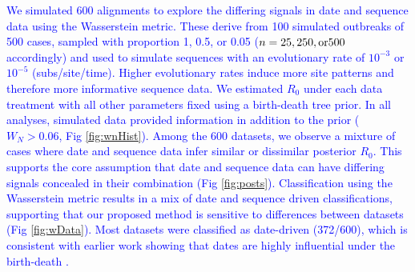 \documentclass{article}
\begin{document}
\textcolor{blue}{We simulated 600 alignments to explore the differing signals in date and sequence data using the Wasserstein metric. These derive from 100 simulated outbreaks of 500 cases, sampled with proportion 1, 0.5, or 0.05 ($n = 25, 250, \textnormal{or} 500$ accordingly) and used to simulate sequences with an evolutionary rate of $10^{-3}$ or $10^{-5}$ (subs/site/time). Higher evolutionary rates induce more site patterns and therefore more informative sequence data. We estimated $R_0$ under each data treatment with all other parameters fixed using a birth-death tree prior. In all analyses, simulated data provided information in addition to the prior ($W_{N}>0.06$, Fig \ref{fig:wnHist}). Among the 600 datasets, we  observe a mixture of cases where date and sequence data infer similar or dissimilar posterior $R_{0}$. This supports the core assumption that date and sequence data can have differing signals concealed in their combination (Fig \ref{fig:posts}). Classification using the Wasserstein metric results in a mix of date and sequence driven classifications, supporting that our proposed method is sensitive to differences between datasets (Fig \ref{fig:wData}). Most datasets were classified as date-driven (372/600), which is consistent with earlier work showing that dates are highly influential under the birth-death \citep{volz_sampling_2014}.}
\end{document}
